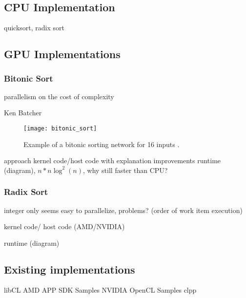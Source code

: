 \subsection{CPU Implementation}


quicksort, radix sort

\subsection{GPU Implementations}

\subsubsection{Bitonic Sort}
parallelism on the cost of complexity

Ken Batcher

\begin{figure}
\centering
\texttt{[image: bitonic\_sort]}
\caption{Example of a bitonic sorting network for 16 inputs \cite{wiki_bitonic_sort}.}
\label{fig:bitonic_sort}
\end{figure}

approach
kernel code/host code with explanation
improvements
runtime (diagram), $n * n \log^2(n)$, why still faster than CPU?

\subsubsection{Radix Sort}
\label{sec:sorting_radix}
integer only
seems easy to parallelize, problems? (order of work item execution)

kernel code/ host code (AMD/NVIDIA)

runtime (diagram)

\subsection{Existing implementations}
libCL
AMD APP SDK Samples
NVIDIA OpenCL Samples
clpp

